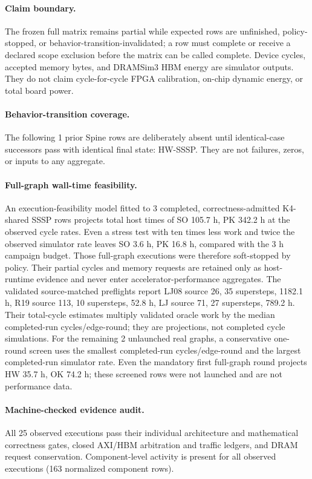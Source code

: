 \documentclass[10pt]{article}
\begin{document}
\paragraph{Claim boundary.}
The frozen full matrix remains partial while expected rows are unfinished,
policy-stopped, or behavior-transition-invalidated; a row must complete or
receive a declared scope exclusion before the matrix can be called complete.
Device cycles, accepted memory bytes, and
DRAMSim3 HBM energy are simulator outputs. They do not claim cycle-for-cycle
FPGA calibration, on-chip dynamic energy, or total board power.

\paragraph{Behavior-transition coverage.}
The following 1 prior Spine rows are deliberately absent
until identical-case successors pass with identical final state: HW-SSSP.
They are not failures, zeros, or inputs to any aggregate.

\paragraph{Full-graph wall-time feasibility.}
An execution-feasibility model fitted to 3 completed,
correctness-admitted K4-shared SSSP rows projects total host times of SO 105.7 h, PK 342.2 h
at the observed cycle rates. Even a stress test with ten times less work and
twice the observed simulator rate leaves SO 3.6 h, PK 16.8 h, compared with the
3 h campaign budget. Those full-graph executions were therefore
soft-stopped by policy. Their partial cycles and memory requests are retained
only as host-runtime evidence and never enter accelerator-performance
aggregates. The validated source-matched preflights report LJ08 source 26, 35 supersteps, 1182.1 h, R19 source 113, 10 supersteps, 52.8 h, LJ source 71, 27 supersteps, 789.2 h. Their total-cycle estimates multiply validated oracle work by the median completed-run cycles/edge-round; they are projections, not completed cycle simulations. For the remaining 2 unlaunched real graphs, a conservative one-round screen uses the smallest completed-run cycles/edge-round and the largest completed-run simulator rate. Even the mandatory first full-graph round projects HW 35.7 h, OK 74.2 h; these screened rows were not launched and are not performance data.

\paragraph{Machine-checked evidence audit.}
All 25 observed executions pass
their individual architecture and mathematical correctness gates, closed AXI/HBM
arbitration and traffic ledgers, and DRAM request conservation. Component-level
activity is present for all observed executions
(163 normalized component rows).
\end{document}
